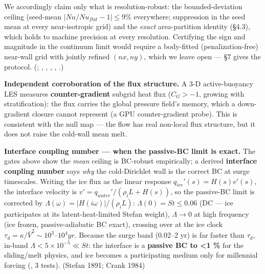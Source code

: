 \documentclass[11pt]{article}
\begin{document}
We accordingly claim only what is resolution-robust: the bounded-deviation ceiling (seed-mean $|Nu/Nu_{flat}-1| \le  9\%$ everywhere; suppression in the seed mean at every near-isotropic grid) and the \emph{exact} area-partition identity (§4.3), which holds to machine precision at every resolution. Certifying the sign and magnitude in the continuum limit would require a body-fitted (penalization-free) near-wall grid with jointly refined $(nx, ny)$, which we leave open — §7 gives the protocol. (; , , , , .)


\textbf{Independent corroboration of the flux structure.} A 3-D active-buoyancy LES measures \textbf{counter-gradient} subgrid heat flux ($C_{G} > -1$, growing with stratification): the flux carries the global pressure field's memory, which a down-gradient closure cannot represent (a GPU counter-gradient probe). This is consistent with the null map — the flow has real non-local flux structure, but it does not raise the cold-wall mean melt.


\textbf{Interface coupling number — when the passive-BC limit is exact.} The gates above show the \emph{mean} ceiling is BC-robust empirically; a derived \textbf{interface coupling number} says \emph{why} the cold-Dirichlet wall is the correct BC at surge timescales. Writing the ice flux as the linear response $q_{ice}'(s)=H(s)v'(s)$, the interface velocity is $v'=q_{water}'/(\rho _{i}L+H(s))$, so the passive-BC limit is corrected by $\Lambda (\omega )=|H(i\omega )|/(\rho _{i}L)$: $\Lambda (0)=St\le 0.06$ (DC — ice participates at its latent-heat-limited Stefan weight), $\Lambda \to 0$ at high frequency (ice frozen, passive-adiabatic BC exact), crossing over at the ice clock $\tau _{d}=\kappa /\bar{V}^{2}\sim 10^{3}–10^{4} yr$. Because the surge band (0.02–2 yr) is far faster than $\tau _{d}$, in-band $\Lambda <5\times 10^{-5}\ll St$: the interface is a \textbf{passive BC to <1 \%} for the sliding/melt physics, and ice becomes a participating medium only for millennial forcing (, 3 tests). (Stefan 1891; Crank 1984)
\end{document}
